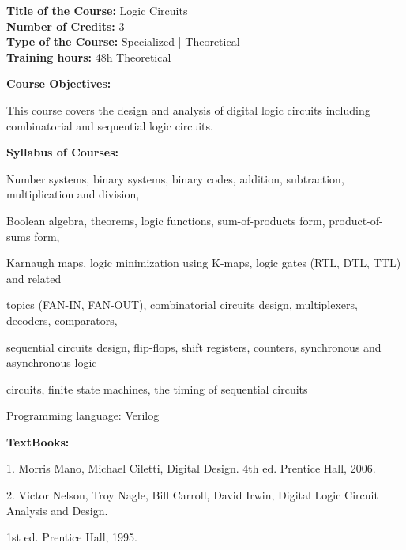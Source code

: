 \documentclass[12pt,a4paper]{article}
\begin{document}
\newpage
\textbf{Title of the Course:} Logic Circuits\\
\textbf{Number of Credits:} 3\\
\textbf{Type of the Course:} Specialized | Theoretical\\
\textbf{Training hours:} 48h Theoretical\par\vspace{4pt}
\textbf{Course Objectives:}\par\vspace{2pt}
This course covers the design and analysis of digital logic circuits including combinatorial and
sequential logic circuits.\par\vspace{4pt}
\textbf{Syllabus of Courses:}\par\vspace{2pt}
Number systems, binary systems, binary codes, addition, subtraction, multiplication and division,\par
Boolean algebra, theorems, logic functions, sum-of-products form, product-of-sums form,\par
Karnaugh maps, logic minimization using K-maps, logic gates (RTL, DTL, TTL) and related\par
topics (FAN-IN, FAN-OUT), combinatorial circuits design, multiplexers, decoders, comparators,\par
sequential circuits design, flip-flops, shift registers, counters, synchronous and asynchronous logic\par
circuits, finite state machines, the timing of sequential circuits\par
Programming language: Verilog\par\vspace{4pt}
\textbf{TextBooks:}\par\vspace{2pt}
1. Morris Mano, Michael Ciletti, Digital Design. 4th ed. Prentice Hall, 2006.\par
2. Victor Nelson, Troy Nagle, Bill Carroll, David Irwin, Digital Logic Circuit Analysis and Design.\par
1st ed. Prentice Hall, 1995.\par
\vspace{4pt}
\end{document}
